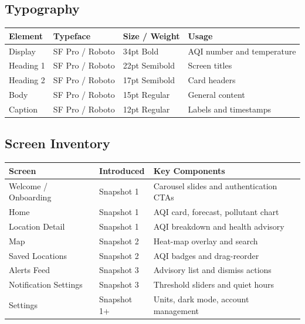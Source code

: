 \documentclass[11pt]{article}
\begin{document}
\subsection{Typography}

\begin{longtable}{|p{}|p{}|p{}|p{}|}
\hline
\textbf{Element} & \textbf{Typeface} & \textbf{Size / Weight} & \textbf{Usage} \\
\hline
Display & SF Pro / Roboto & 34pt Bold & AQI number and temperature \\
\hline
Heading 1 & SF Pro / Roboto & 22pt Semibold & Screen titles \\
\hline
Heading 2 & SF Pro / Roboto & 17pt Semibold & Card headers \\
\hline
Body & SF Pro / Roboto & 15pt Regular & General content \\
\hline
Caption & SF Pro / Roboto & 12pt Regular & Labels and timestamps \\
\hline
\end{longtable}

\subsection{Screen Inventory}

\begin{longtable}{|p{}|p{}|p{}|}
\hline
\textbf{Screen} & \textbf{Introduced} & \textbf{Key Components} \\
\hline
Welcome / Onboarding & Snapshot 1 & Carousel slides and authentication CTAs \\
\hline
Home & Snapshot 1 & AQI card, forecast, pollutant chart \\
\hline
Location Detail & Snapshot 1 & AQI breakdown and health advisory \\
\hline
Map & Snapshot 2 & Heat-map overlay and search \\
\hline
Saved Locations & Snapshot 2 & AQI badges and drag-reorder \\
\hline
Alerts Feed & Snapshot 3 & Advisory list and dismiss actions \\
\hline
Notification Settings & Snapshot 3 & Threshold sliders and quiet hours \\
\hline
Settings & Snapshot 1+ & Units, dark mode, account management \\
\hline
\end{longtable}
\end{document}

